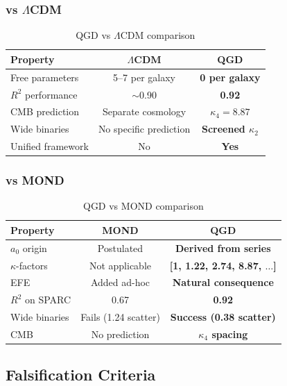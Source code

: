 \documentclass[11pt,a4paper]{article}
\theoremstyle{definition}
\theoremstyle{remark}
\begin{document}
	\subsubsection{vs $\Lambda$CDM}
	
	\begin{table}[ht]
		\centering
		\caption{QGD vs $\Lambda$CDM comparison}
		\label{tab:lcdm_comparison}
		\begin{tabular}{@{}lcc@{}}
			\toprule
			Property & $\Lambda$CDM & QGD \\
			\midrule
			Free parameters & 5--7 per galaxy & \textbf{0 per galaxy} \\
			$R^2$ performance & $\sim$0.90 & \textbf{0.92} \\
			CMB prediction & Separate cosmology & \textbf{$\kappa_4 = 8.87$} \\
			Wide binaries & No specific prediction & \textbf{Screened $\kappa_2$} \\
			Unified framework & No & \textbf{Yes} \\
			\bottomrule
		\end{tabular}
	\end{table}
	
	\subsubsection{vs MOND}
	
	\begin{table}[ht]
		\centering
		\caption{QGD vs MOND comparison}
		\label{tab:mond_comparison}
		\begin{tabular}{@{}lcc@{}}
			\toprule
			Property & MOND & QGD \\
			\midrule
			$a_0$ origin & Postulated & \textbf{Derived from series} \\
			$\kappa$-factors & Not applicable & \textbf{[1, 1.22, 2.74, 8.87, $\ldots$]} \\
			EFE & Added ad-hoc & \textbf{Natural consequence} \\
			$R^2$ on SPARC & 0.67 & \textbf{0.92} \\
			Wide binaries & Fails (1.24 scatter) & \textbf{Success (0.38 scatter)} \\
			CMB & No prediction & \textbf{$\kappa_4$ spacing} \\
			\bottomrule
		\end{tabular}
	\end{table}
	
	\subsection{Falsification Criteria}
	
\end{document}
